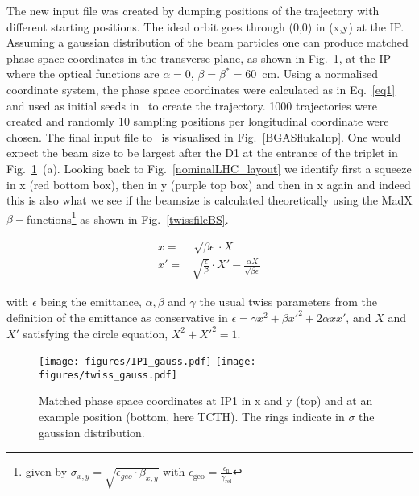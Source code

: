 The new input file was created by dumping positions of the trajectory with different starting positions. The ideal orbit goes through (0,0) in (x,y) at the IP. Assuming a gaussian distribution of the beam particles one can produce matched phase space coordinates in the transverse plane, as shown in Fig.~\ref{ip1_gauss}, at the IP where the optical functions are $\alpha = 0$, $\beta = \beta^* = 60$~cm. Using a normalised coordinate system, the phase space coordinates were calculated as in Eq.~\ref{eq1} and used as initial seeds in \fluka~to create the trajectory. 1000 trajectories were created and randomly 10 sampling positions per longitudinal coordinate were chosen. The final input file to \fluka~is visualised in Fig.~\ref{BGASflukaInp}. One would expect the beam size to be largest after the D1 at the entrance of the triplet in Fig.~\ref{ip1_gauss}~(a). Looking back to Fig.~\ref{nominalLHC_layout} we identify first a squeeze in x (red bottom box), then in y (purple top box) and then in x again and indeed this is also what we see if the beamsize is calculated theoretically using the MadX $\beta-$functions\footnote{given by $\sigma_{x,y} = \sqrt{\epsilon_{geo} \cdot \beta_{x,y}}$ with $\epsilon_{\textrm{geo}} = \frac{ \epsilon_{\textrm{n}}}{\gamma_{\textrm{rel}}}$} as shown in Fig.~\ref{twissfileBS}.

\begin{equation} \label{eq1}
  \begin{split}
x = & \, \sqrt{\beta \epsilon} \cdot X \\
x' = & \sqrt{\frac{\epsilon}{\beta}} \cdot X' - \frac{\alpha X}{\sqrt{\beta \epsilon}}
  \end{split}
\end{equation}

with $\epsilon$ being the emittance, $\alpha, \beta$ and $\gamma$ the usual twiss parameters from the definition of the emittance as conservative in $\epsilon = \gamma x^2 + \beta x'^2 + 2 \alpha x x'$, and $X$ and $X'$ satisfying the circle equation, $X^2 + X'^2 = 1$. 


\begin{figure}%
\begin{center}
\texttt{[image: figures/IP1\_gauss.pdf]}
\texttt{[image: figures/twiss\_gauss.pdf]}
\end{center}
\vspace{-0.6cm}
 \caption{Matched phase space coordinates at IP1 in x and y (top) and at an example position (bottom, here TCTH). The rings indicate in $\sigma$ the gaussian distribution.
  \label{ip1_gauss}}
\end{figure}


